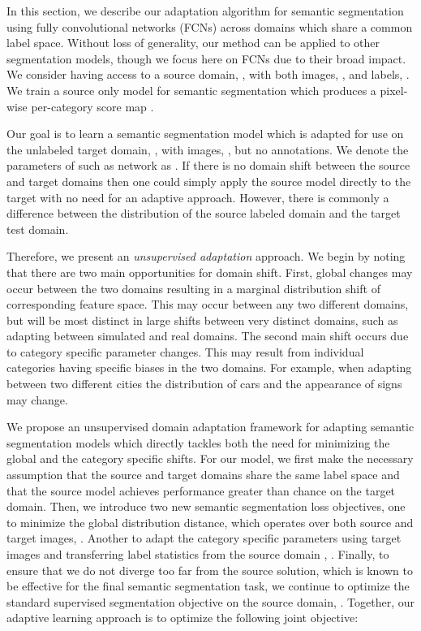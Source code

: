 \documentclass[10pt,twocolumn,letterpaper]{article}
\begin{document}
In this section, we describe our adaptation algorithm for semantic segmentation using fully convolutional networks (FCNs) across domains which share a common label space. Without loss of generality, our method can be applied to other segmentation models, though we focus here on FCNs due to their broad impact. We consider having access to a source domain, , with both images, , and labels, . 
We train a source only model for semantic segmentation which produces a pixel-wise per-category score map .

Our goal is to learn a semantic segmentation model which is adapted for use on the unlabeled target domain, , with images, , but no annotations. We denote the parameters of such as network as . If there is no domain shift between the source and target domains then one could simply apply the source model directly to the target with no need for an adaptive approach. 
However, there is commonly a difference between the distribution of the source labeled domain and the target test domain. 


Therefore, we present an \textit{unsupervised adaptation} approach. We begin by noting that there are two main opportunities for domain shift. First, global changes may occur between the two domains resulting in a marginal distribution shift of corresponding feature space. This may occur between any two different domains, but will be most distinct in large shifts between very distinct domains, such as adapting between simulated and real domains.
The second main shift occurs due to category specific parameter changes. This may result from individual categories having specific biases in the two domains. For example, when adapting between two different cities the distribution of cars and the appearance of signs may change.




We propose an unsupervised domain adaptation framework for adapting semantic segmentation models which directly tackles both the need for minimizing the global and the category specific shifts. For our model, we first make the necessary assumption that the source and target domains share the same label space and that the source model achieves performance greater than chance on the target domain. Then, we introduce two new semantic segmentation loss objectives, one to minimize the global distribution distance, which operates over both source and target images, .  Another to adapt the category specific parameters using target images and transferring label statistics from the source domain , . Finally, to ensure that we do not diverge too far from the source solution, which is known to be effective for the final semantic segmentation task, we continue to optimize the standard supervised segmentation objective on the source domain, . Together, our adaptive learning approach is to optimize the following joint objective: 
\end{document}
